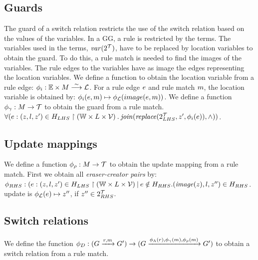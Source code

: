 \subsection{Guards}
The guard of a switch relation restricts the use of the switch relation based on the values of the variables. In a GG, a rule is restricted by the terms. The variables used in the terms, $\mathit{var}(2^{\mathcal{T}})$, have to be replaced by location variables to obtain the guard. To do this, a rule match is needed to find the images of the variables. The rule edges to the variables have as image the edges representing the location variables. We define a function to obtain the location variable from a rule edge: $\phi_i: \mathbb{E} \times M \stackrel{\sim}{\longrightarrow} \mathcal{L}$. For a rule edge $e$ and rule match $m$, the location variable is obtained by: $\phi_i(e,m) \mapsto \phi_{\mathcal{L}}(image(e,m))$. We define a function $\phi_\gamma: M \rightarrow \mathcal{T}$ to obtain the guard from a rule match. $\forall (e:(z, l, z') \in H_{LHS}\restriction (\mathbb{W} \times L \times \mathcal{V})\: .\: \mathit{join}(\mathit{replace}(2^{\mathcal{T}}_{LHS},z', \phi_i(e)), \land))$.

\subsection{Update mappings}
We define a function $\phi_\rho: M \rightarrow \mathcal{T}$ to obtain the update mapping from a rule match. First we obtain all \textit{eraser-creator pairs} by: $\phi_{RHS}: (e:(z, l, z') \in H_{LHS}\restriction (\mathbb{W} \times L \times \mathcal{V})\: |\: e \notin H_{RHS} . (\mathit{image}(z), l, z'') \in H_{RHS}$. update is $\phi_{\mathcal{L}}(e) \mapsto z''$, if $z'' \in 2^{\mathcal{T}}_{RHS}$.

\subsection{Switch relations}
We define the function $\phi_D: (G \xrightarrow{r, m} G') \rightarrow (G\xrightarrow{\phi_\Lambda(r), \phi_\gamma(m), \phi_\rho(m)}G')$ to obtain a switch relation from a rule match. 

